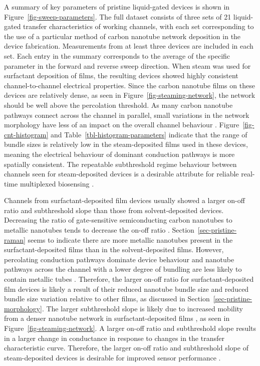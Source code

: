 \documentclass[
  a4paper,
]{scrbook}
\begin{document}
A summary of key parameters of pristine liquid-gated devices is shown in
Figure~\ref{fig-sweep-parameters}. The full dataset consists of three
sets of 21 liquid-gated transfer characteristics of working channels,
with each set corresponding to the use of a particular method of carbon
nanotube network deposition in the device fabrication. Measurements from
at least three devices are included in each set. Each entry in the
summary corresponds to the average of the specific parameter in the
forward and reverse sweep direction. When steam was used for surfactant
deposition of films, the resulting devices showed highly consistent
channel-to-channel electrical properties. Since the carbon nanotube
films on these devices are relatively dense, as seen in
Figure~\ref{fig-steaming-network}, the network should be well above the
percolation threshold. As many carbon nanotube pathways connect across
the channel in parallel, small variations in the network morphology have
less of an impact on the overall channel behaviour
\autocite{Murugathas2018}. Figure~\ref{fig-cnt-histogram} and
Table~\ref{tbl-histogram-parameters} indicate that the range of bundle
sizes is relatively low in the steam-deposited films used in these
devices, meaning the electrical behaviour of dominant conduction
pathways is more spatially consistent. The repeatable subthreshold
regime behaviour between channels seen for steam-deposited devices is a
desirable attribute for reliable real-time multiplexed biosensing
\autocite{Kauffman2008,Heller2009,Gao2010}.

Channels from surfactant-deposited film devices usually showed a larger
on-off ratio and subthreshold slope than those from solvent-deposited
devices. Decreasing the ratio of gate-sensitive semiconducting carbon
nanotubes to metallic nanotubes tends to decrease the on-off ratio
\autocite{LeMieux2008,Rouhi2011,Zaumseil2015,Murugathas2018}.
Section~\ref{sec-pristine-raman} seems to indicate there are more
metallic nanotubes present in the surfactant-deposited films than in the
solvent-deposited films. However, percolating conduction pathways
dominate device behaviour and nanotube pathways across the channel with
a lower degree of bundling are less likely to contain metallic tubes
\autocite{Murugathas2018}. Therefore, the larger on-off ratio for
surfactant-deposited film devices is likely a result of their reduced
nanotube bundle size and reduced bundle size variation relative to other
films, as discussed in Section~\ref{sec-pristine-morphology}. The larger
subthreshold slope is likely due to increased mobility from a denser
nanotube network in surfactant-deposited films \autocite{Rouhi2011}, as
seen in Figure~\ref{fig-steaming-network}. A larger on-off ratio and
subthreshold slope results in a larger change in conductance in response
to changes in the transfer characteristic curve. Therefore, the larger
on-off ratio and subthreshold slope of steam-deposited devices is
desirable for improved sensor performance
\autocite{Kauffman2008,Heller2009,Gao2010}.
\end{document}
